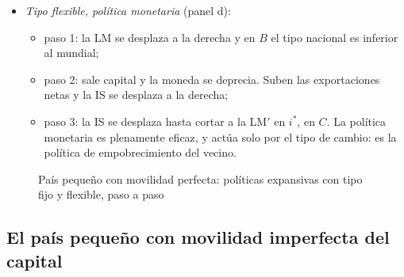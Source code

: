 \documentclass[11pt]{article}
\begin{document}
\begin{itemize}
\begin{itemize}
  \item paso 3: la IS vuelve hasta su posición inicial, porque la LM no se ha movido y solo corta a la BP en $A$: $C=A$. El gasto público expulsa exportaciones netas en la misma cuantía (expulsión exterior): la política fiscal es ineficaz.
  \end{itemize}
\item \emph{Tipo flexible, política monetaria} (panel d):
  \begin{itemize}
  \item paso 1: la LM se desplaza a la derecha y en $B$ el tipo nacional es inferior al mundial;
  \item paso 2: sale capital y la moneda se deprecia. Suben las exportaciones netas y la IS se desplaza a la derecha;
  \item paso 3: la IS se desplaza hasta cortar a la LM$'$ en $i^*$, en $C$. La política monetaria es plenamente eficaz, y actúa solo por el tipo de cambio: es la política de empobrecimiento del vecino.
  \end{itemize}
\end{itemize}

\begin{figure}[H]
\centering
\caption{País pequeño con movilidad perfecta: políticas expansivas con tipo fijo y flexible, paso a paso}\label{fig:mf-pequeno-perfecta}
\end{figure}

\subsection*{El país pequeño con movilidad imperfecta del capital}
\end{document}
